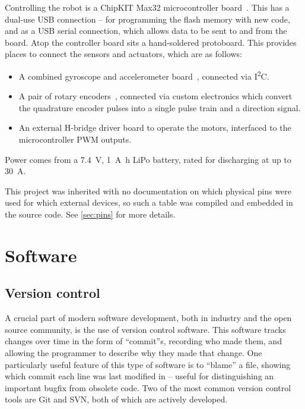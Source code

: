 \documentclass[main.tex]{subfiles}
\begin{document}
	Controlling the robot is a ChipKIT Max32 microcontroller board~\cite{max32}.
	This has a dual-use USB connection -- for programming the flash memory with new code, and as a USB serial connection, which allows data to be sent to and from the board.
	Atop the controller board sits a hand-soldered protoboard. This provides places to connect the sensors and actuators, which are as follows:
	\begin{itemize}[noitemsep]
		\item
			A combined gyroscope and accelerometer board~\cite{imu}, connected via I\textsuperscript{2}C.
		\item
			A pair of rotary encoders~\cite{encoder}, connected via custom electronics which convert the quadrature encoder pulses into a single pulse train and a direction signal.
		\item
			An external H-bridge driver board to operate the motors, interfaced to the microcontroller PWM outputs.
	\end{itemize}
	Power comes from a \SI{7.4}{\volt}, \SI{1}{\ampere\hour}  LiPo battery, rated for discharging at up to \SI{30}{\ampere}.

	This project was inherited with no documentation on which physical pins were used for which external devices, so such a table was compiled and embedded in the source code.
	See \cref{sec:pins} for more details.

\section{Software}

	\subsection{Version control}

	A crucial part of modern software development, both in industry and the open source community, is the use of version control software.
	This software tracks changes over time in the form of \enquote{commit}s, recording who made them, and allowing the programmer to describe why they made that change.
	One particularly useful feature of this type of software is to \enquote{blame} a file, showing which commit each line was last modified in -- useful for distinguishing an important bugfix from obsolete code.
	Two of the most common version control tools are Git and SVN, both of which are actively developed.
\end{document}
